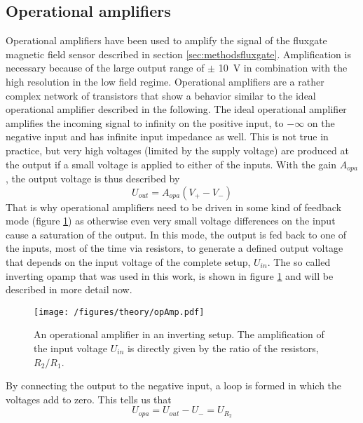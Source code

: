             \subsection{Operational amplifiers}
            Operational amplifiers have been used to amplify the signal of the fluxgate magnetic field sensor described in section \ref{sec:methodsfluxgate}. Amplification is necessary because of the large output range of $\pm$ \SI{10}{\volt} in combination with the high resolution in the low field regime. Operational amplifiers are a rather complex network of transistors that show a behavior similar to the ideal operational amplifier described in the following. The ideal operational amplifier amplifies the incoming signal to infinity on the positive input, to $-\infty$ on the negative input and has infinite input impedance as well. This is not true in practice, but very high voltages (limited by the supply voltage) are produced at the output if a small voltage is applied to either of the inputs. With the gain $A_{opa}$, the output voltage is thus described by
                \begin{equation}
                        \label{equation:theory:OPAvoltage}
                    U_{out} = A_{opa}(V_+ - V_-)
                \end{equation}
                That is why operational amplifiers need to be driven in some kind of feedback mode (figure \ref{figure:theory:opAmp}) as otherwise even very small voltage differences on the input cause a saturation of the output. In this mode, the output is fed back to one of the inputs, most of the time via resistors, to generate a defined output voltage that depends on the input voltage of the complete setup, $U_{in}$. The so called inverting opamp that was used in this work, is shown in figure \ref{figure:theory:opAmp} and will be described in more detail now.
                \begin{figure}
                    \texttt{[image: /figures/theory/opAmp.pdf]}
                    \caption[Operational amplifier]{An operational amplifier in an inverting setup. The amplification of the input voltage $U_{in}$ is directly given by the ratio of the resistors, $R_2/R_1$.}
                    \label{figure:theory:opAmp}
                \end{figure}
                By connecting the output to the negative input, a loop is formed in which the voltages add to zero. This tells us that
                \begin{equation*}
                    U_{opa} = U_{out} - U_- = U_{R_2}
                \end{equation*}
